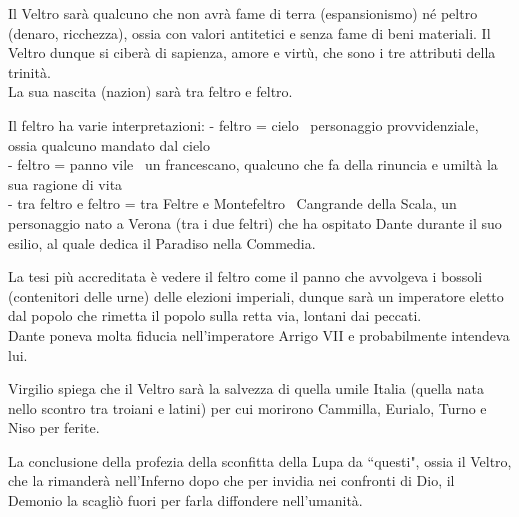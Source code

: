 \documentclass{article}
\begin{document}

Il Veltro sarà qualcuno che non avrà fame di terra (espansionismo) né peltro (denaro, ricchezza), ossia con valori antitetici e senza fame di beni materiali. Il Veltro dunque si ciberà di sapienza, amore e virtù, che sono i tre attributi della trinità.\\
La sua nascita (nazion) sarà tra feltro e feltro.

Il feltro ha varie interpretazioni:
- feltro = cielo \textrightarrow\  personaggio provvidenziale, ossia qualcuno mandato dal cielo\\
- feltro = panno vile \textrightarrow\  un francescano, qualcuno che fa della rinuncia e umiltà la sua ragione di vita\\
- tra feltro e feltro = tra Feltre e Montefeltro \textrightarrow\  Cangrande della Scala, un personaggio nato a Verona (tra i due feltri) che ha ospitato Dante durante il suo esilio, al quale dedica il Paradiso nella Commedia.

La tesi più accreditata è vedere il feltro come il panno che avvolgeva i bossoli (contenitori delle urne) delle elezioni imperiali, dunque sarà un imperatore eletto dal popolo che rimetta il popolo sulla retta via, lontani dai peccati.\\
Dante poneva molta fiducia nell'imperatore Arrigo VII e probabilmente intendeva lui.


Virgilio spiega che il Veltro sarà la salvezza di quella umile Italia (quella nata nello scontro tra troiani e latini) per cui morirono Cammilla, Eurialo, Turno e Niso per ferite.


La conclusione della profezia della sconfitta della Lupa da ``questi", ossia il Veltro, che la rimanderà nell'Inferno dopo che per invidia nei confronti di Dio, il Demonio la scagliò fuori per farla diffondere nell'umanità.

\end{document}
